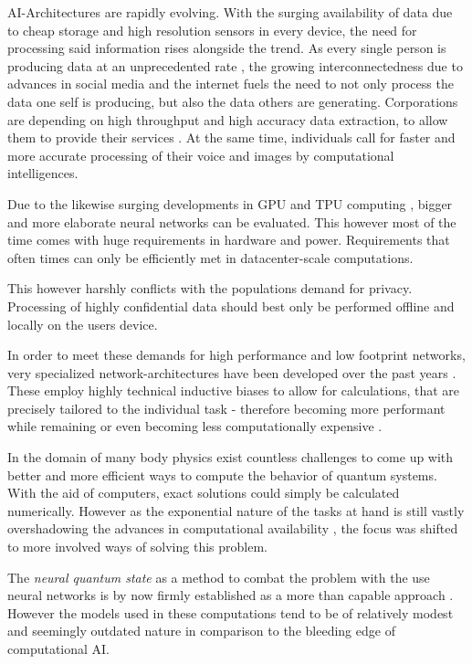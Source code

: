 AI-Architectures are rapidly evolving. With the surging availability of data due to cheap storage \cite*[]{costDataStorage} and high resolution sensors in every device, the need for processing said information rises alongside the trend.
As every single person is producing data at an unprecedented rate \cite*[]{dataCreatedRate}, the growing interconnectedness due to advances in social media and the internet fuels the need to not only process the data one self is producing, but also the data others are generating.
Corporations are depending on high throughput and high accuracy data extraction, to allow them to provide their services \cite*[]{marketsizeArtificialIntelligence}.
At the same time, individuals call for faster and more accurate processing of their voice and images by computational intelligences. 

Due to the likewise surging developments in GPU and TPU computing \cite*[]{gpuPerformanceOverTime}, bigger and more elaborate neural networks can be evaluated.
This however most of the time comes with huge requirements in hardware and power. 
Requirements that often times can only be efficiently met in datacenter-scale computations.

This however harshly conflicts with the populations demand for privacy. 
Processing of highly confidential data should best only be performed offline and locally on the users device.

In order to meet these demands for high performance and low footprint networks, very specialized network-architectures have been developed over the past years \cite[]{attentionIsAllYouNeed, metaformerPaper}. 
These employ highly technical inductive biases to allow for calculations, that are precisely tailored to the individual task - therefore becoming more performant while remaining or even becoming less computationally expensive \cite*[]{mobileNetPaper}.

In the domain of many body physics exist countless challenges to come up with better and more efficient ways to compute the behavior of quantum systems.
With the aid of computers, exact solutions could \glqq simply\grqq{} be calculated numerically.
However as the exponential nature of the tasks at hand is still vastly overshadowing the advances in computational availability \cite*[]{quantumMonteCarloSimulationsOfSolids}, the focus was shifted to more involved ways of solving this problem.

The \emph{neural quantum state} as a method to combat the problem with the use neural networks is by now firmly established as a more than capable approach \cite*[]{quantumMBPwithneuralNetworks}. However the models used in these computations tend to be of relatively modest and seemingly \glqq outdated\grqq{} nature in comparison to the bleeding edge of computational AI.

